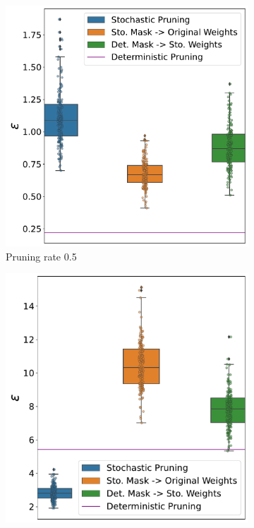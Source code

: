 \begin{figure}[!htb]
  \centering
     \begin{subfigure}[b]{0.65\columnwidth}
         \centering
    \includegraphics[width=\columnwidth]{figures/epsilon_allN_all_pr_0.5_sigma=0.005.pdf}
    \caption{Pruning rate 0.5} 
    \label{fig:pr0.5sigma0.005}
     \end{subfigure}
     \hfill
     \begin{subfigure}[b]{0.65\columnwidth}
         \centering
   \includegraphics[width=\columnwidth]{figures/epsilon_allN_all_pr_0.8_sigma=0.005.pdf}
   

\end{subfigure}
\end{figure}
